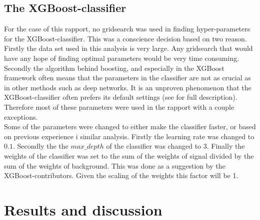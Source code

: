 \documentclass{article}
\begin{document}
\subsection{The XGBoost-classifier}
For the case of this rapport, no gridsearch was used in finding hyper-parameters for the XGBoost-classifier. This was a conscience decision based on two reason. Firstly the data set used in this analysis is very large. Any gridsearch that would have any hope of finding optimal parameters would be very time consuming. Secondly the algorithm behind boosting, and especially in the XGBoost framework often means that the parameters in the classifier are not as crucial as in other methods such as deep networks. It is an unproven phenomenon that the XGBoost-classifier often prefers its default settings (see \cite{XGB} for full description). Therefore most of these parameters were used in the rapport with a couple exceptions.
\\
Some of the parameters were changed to either make the classifier faster, or based on previous experience i similar analysis. Firstly the learning rate was changed to $0.1$. Secondly the the $max\_depth$ of the classifier was changed to 3. Finally the weights of the classifier was set to the sum of the weights of signal divided by the sum of the weights of background. This was done as a suggestion by the XGBoost-contributors. Given the scaling of the weights this factor will be 1. 
\section{Results and discussion}
\end{document}
